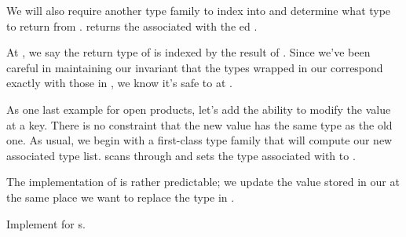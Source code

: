 \documentclass[book.tex]{subfiles}
\begin{document}


We will also require another type family to index into  and determine
what type to return from .  returns the 
associated with the ed .



At , we say the return type of  is  indexed by the
result of . Since we've been careful in maintaining our
invariant that the types wrapped in our  correspond exactly with
those in , we know it's safe to  at .

As one last example for open products, let's add the ability to modify the value
at a key. There is no constraint that the new value has the same type as the old
one. As usual, we begin with a first-class type family that will compute our new
associated type list.  scans through  and sets the type
associated with  to .


The implementation of  is rather predictable; we update the value
stored in our  at the same place we want to replace the type in
.


\begin{exercise}
Implement  for s.
\end{exercise}
\begin{solution}
\end{solution}
\end{document}

